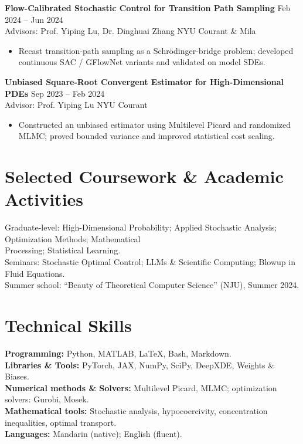 \documentclass[11pt]{article}
\newlength{\cvitemsep}     \setlength{\cvitemsep}{3pt}  %
\newlength{\projsep}      \setlength{\projsep}{\dimexpr 3\cvitemsep\relax} %
\begin{document}
\noindent\textbf{Flow-Calibrated Stochastic Control for Transition Path Sampling} \hfill Feb 2024 -- Jun 2024 \\
Advisors: Prof. Yiping Lu, Dr. Dinghuai Zhang \hfill NYU Courant \& Mila
\begin{itemize}
  \item Recast transition-path sampling as a Schr\"odinger-bridge problem; developed continuous SAC / GFlowNet variants and validated on model SDEs.
\end{itemize}
\vspace{\projsep}

\noindent\textbf{Unbiased Square-Root Convergent Estimator for High-Dimensional PDEs} \hfill Sep 2023 -- Feb 2024 \\
Advisor: Prof. Yiping Lu \hfill NYU Courant
\begin{itemize}
  \item Constructed an unbiased estimator using Multilevel Picard and randomized MLMC; proved bounded variance and improved statistical cost scaling.
\end{itemize}

\vspace{\projsep}

\section{Selected Coursework \& Academic Activities}
\noindent Graduate-level: High-Dimensional Probability; Applied Stochastic Analysis; Optimization Methods; Mathematical\\
\noindent\quad Processing; Statistical Learning. \\[8pt]
\noindent Seminars: Stochastic Optimal Control; LLMs \& Scientific Computing; Blowup in Fluid Equations. \\[6pt]
\noindent Summer school: ``Beauty of Theoretical Computer Science'' (NJU), Summer 2024.

\vspace{\projsep}

\section{Technical Skills}
\noindent \textbf{Programming:} Python, MATLAB, \LaTeX, Bash, Markdown. \\[6pt]
\noindent \textbf{Libraries \& Tools:} PyTorch, JAX, NumPy, SciPy, DeepXDE, Weights \& Biases. \\[6pt]
\noindent \textbf{Numerical methods \& Solvers:} Multilevel Picard, MLMC; optimization solvers: Gurobi, Mosek. \\[6pt]
\noindent \textbf{Mathematical tools:} Stochastic analysis, hypocoercivity, concentration inequalities, optimal transport. \\[6pt]
\noindent \textbf{Languages:} Mandarin (native); English (fluent).
\end{document}

